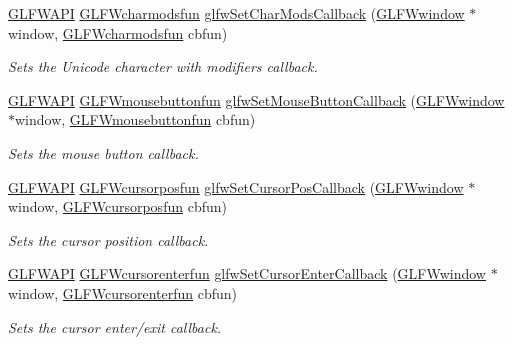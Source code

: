 \begin{DoxyCompactItemize}
\hyperlink{glfw3_8h_a56da5036b2cc259351ae22fd6439bb47}{G\+L\+F\+W\+A\+P\+I} \hyperlink{group__input_gae36fb6897d2b7df9b128900c8ce9c507}{G\+L\+F\+Wcharmodsfun} \hyperlink{group__input_gae6eee0bda7429bfe8028615847cf6795}{glfw\+Set\+Char\+Mods\+Callback} (\hyperlink{group__window_ga3c96d80d363e67d13a41b5d1821f3242}{G\+L\+F\+Wwindow} $\ast$window, \hyperlink{group__input_gae36fb6897d2b7df9b128900c8ce9c507}{G\+L\+F\+Wcharmodsfun} cbfun)
\begin{DoxyCompactList}\small\item\em Sets the Unicode character with modifiers callback. \end{DoxyCompactList}\item 
\hyperlink{glfw3_8h_a56da5036b2cc259351ae22fd6439bb47}{G\+L\+F\+W\+A\+P\+I} \hyperlink{group__input_ga39893a4a7e7c3239c98d29c9e084350c}{G\+L\+F\+Wmousebuttonfun} \hyperlink{group__input_ga20e5ba1ce4e086aedd48a06dc311c95f}{glfw\+Set\+Mouse\+Button\+Callback} (\hyperlink{group__window_ga3c96d80d363e67d13a41b5d1821f3242}{G\+L\+F\+Wwindow} $\ast$window, \hyperlink{group__input_ga39893a4a7e7c3239c98d29c9e084350c}{G\+L\+F\+Wmousebuttonfun} cbfun)
\begin{DoxyCompactList}\small\item\em Sets the mouse button callback. \end{DoxyCompactList}\item 
\hyperlink{glfw3_8h_a56da5036b2cc259351ae22fd6439bb47}{G\+L\+F\+W\+A\+P\+I} \hyperlink{group__input_ga4cfad918fa836f09541e7b9acd36686c}{G\+L\+F\+Wcursorposfun} \hyperlink{group__input_ga9c49c0d3d3c775c3124726f1d902124d}{glfw\+Set\+Cursor\+Pos\+Callback} (\hyperlink{group__window_ga3c96d80d363e67d13a41b5d1821f3242}{G\+L\+F\+Wwindow} $\ast$window, \hyperlink{group__input_ga4cfad918fa836f09541e7b9acd36686c}{G\+L\+F\+Wcursorposfun} cbfun)
\begin{DoxyCompactList}\small\item\em Sets the cursor position callback. \end{DoxyCompactList}\item 
\hyperlink{glfw3_8h_a56da5036b2cc259351ae22fd6439bb47}{G\+L\+F\+W\+A\+P\+I} \hyperlink{group__input_ga51ab436c41eeaed6db5a0c9403b1c840}{G\+L\+F\+Wcursorenterfun} \hyperlink{group__input_gaa20014985561efeb2c53f1956f727830}{glfw\+Set\+Cursor\+Enter\+Callback} (\hyperlink{group__window_ga3c96d80d363e67d13a41b5d1821f3242}{G\+L\+F\+Wwindow} $\ast$window, \hyperlink{group__input_ga51ab436c41eeaed6db5a0c9403b1c840}{G\+L\+F\+Wcursorenterfun} cbfun)
\begin{DoxyCompactList}\small\item\em Sets the cursor enter/exit callback. \end{DoxyCompactList}\item 

\end{DoxyCompactItemize}
